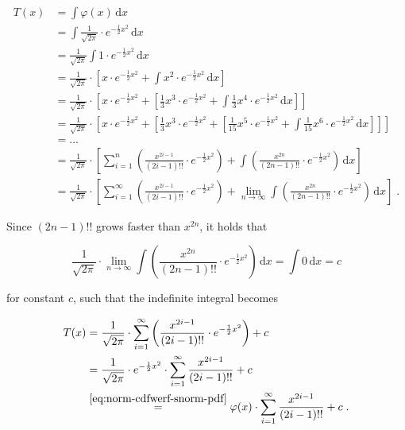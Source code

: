 \documentclass[a4paper,12pt,twoside]{book}
\begin{document}
\begin{equation} \label{eq:norm-cdfwerf-snorm-pdf-ii-s1}
\begin{split}
T(x) &= \int \varphi(x) \, \mathrm{d}x \\
&= \int \frac{1}{\sqrt{2 \pi}} \cdot e^{-\frac{1}{2} x^2} \, \mathrm{d}x \\
&= \frac{1}{\sqrt{2 \pi}} \int 1 \cdot e^{-\frac{1}{2} x^2} \, \mathrm{d}x \\
&= \frac{1}{\sqrt{2 \pi}} \cdot \left[ x \cdot e^{-\frac{1}{2} x^2} + \int x^2 \cdot e^{-\frac{1}{2} x^2} \, \mathrm{d}x \right] \\
&= \frac{1}{\sqrt{2 \pi}} \cdot \left[ x \cdot e^{-\frac{1}{2} x^2} + \left[ \frac{1}{3} x^3 \cdot e^{-\frac{1}{2} x^2} + \int \frac{1}{3} x^4 \cdot e^{-\frac{1}{2} x^2} \, \mathrm{d}x \right] \right] \\
&= \frac{1}{\sqrt{2 \pi}} \cdot \left[ x \cdot e^{-\frac{1}{2} x^2} + \left[ \frac{1}{3} x^3 \cdot e^{-\frac{1}{2} x^2} + \left[ \frac{1}{15} x^5 \cdot e^{-\frac{1}{2} x^2} + \int \frac{1}{15} x^6 \cdot e^{-\frac{1}{2} x^2} \, \mathrm{d}x \right] \right] \right] \\
&= \ldots \\
&= \frac{1}{\sqrt{2 \pi}} \cdot \left[ \sum_{i=1}^{n} \left( \frac{x^{2i-1}}{(2i-1)!!} \cdot e^{-\frac{1}{2} x^2} \right) + \int \left( \frac{x^{2n}}{(2n-1)!!} \cdot e^{-\frac{1}{2} x^2} \right) \, \mathrm{d}x \right] \\
&= \frac{1}{\sqrt{2 \pi}} \cdot \left[ \sum_{i=1}^{\infty} \left( \frac{x^{2i-1}}{(2i-1)!!} \cdot e^{-\frac{1}{2} x^2} \right) + \lim_{n \to \infty} \int \left( \frac{x^{2n}}{(2n-1)!!} \cdot e^{-\frac{1}{2} x^2} \right) \, \mathrm{d}x \right] \; .
\end{split}
\end{equation}

Since $(2n-1)!!$ grows faster than $x^{2n}$, it holds that

\begin{equation} \label{eq:norm-cdfwerf-int-const}
\frac{1}{\sqrt{2 \pi}} \cdot \lim_{n \to \infty} \int \left( \frac{x^{2n}}{(2n-1)!!} \cdot e^{-\frac{1}{2} x^2} \right) \, \mathrm{d}x = \int 0 \, \mathrm{d}x = c
\end{equation}

for constant $c$, such that the indefinite integral becomes

\begin{equation} \label{eq:norm-cdfwerf-snorm-pdf-ii-s2}
\begin{split}
T(x) &= \frac{1}{\sqrt{2 \pi}} \cdot \sum_{i=1}^{\infty} \left( \frac{x^{2i-1}}{(2i-1)!!} \cdot e^{-\frac{1}{2} x^2} \right) + c \\
&= \frac{1}{\sqrt{2 \pi}} \cdot e^{-\frac{1}{2} x^2} \cdot \sum_{i=1}^{\infty} \frac{x^{2i-1}}{(2i-1)!!} + c \\
&\overset{\eqref{eq:norm-cdfwerf-snorm-pdf}}{=} \varphi(x) \cdot \sum_{i=1}^{\infty} \frac{x^{2i-1}}{(2i-1)!!} + c \; .
\end{split}
\end{equation}
\end{document}
